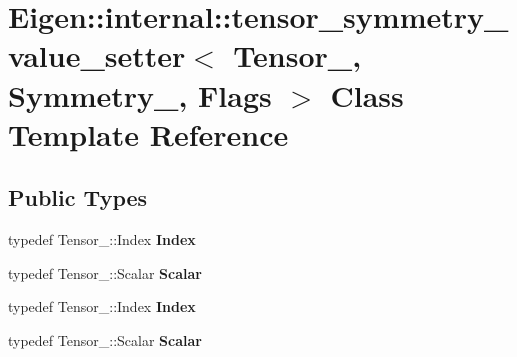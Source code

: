 \hypertarget{class_eigen_1_1internal_1_1tensor__symmetry__value__setter}{}\section{Eigen\+:\+:internal\+:\+:tensor\+\_\+symmetry\+\_\+value\+\_\+setter$<$ Tensor\+\_\+, Symmetry\+\_\+, Flags $>$ Class Template Reference}
\label{class_eigen_1_1internal_1_1tensor__symmetry__value__setter}
\subsection*{Public Types}
\begin{DoxyCompactItemize}
\item 
\mbox{\label{class_eigen_1_1internal_1_1tensor__symmetry__value__setter_a1850f83cd326cfc0d18a62e4249ef56b}} 
typedef Tensor\+\_\+\+::\+Index {\bfseries Index}
\item 
\mbox{\label{class_eigen_1_1internal_1_1tensor__symmetry__value__setter_ab3c5a1637e3accf16b62bcf5ffaccfa6}} 
typedef Tensor\+\_\+\+::\+Scalar {\bfseries Scalar}
\item 
\mbox{\label{class_eigen_1_1internal_1_1tensor__symmetry__value__setter_a1850f83cd326cfc0d18a62e4249ef56b}} 
typedef Tensor\+\_\+\+::\+Index {\bfseries Index}
\item 
\mbox{\label{class_eigen_1_1internal_1_1tensor__symmetry__value__setter_ab3c5a1637e3accf16b62bcf5ffaccfa6}} 
typedef Tensor\+\_\+\+::\+Scalar {\bfseries Scalar}
\end{DoxyCompactItemize}
